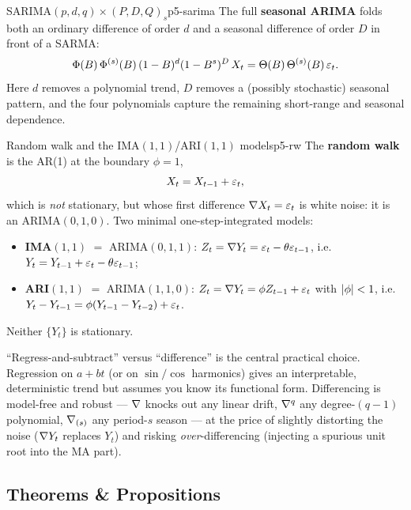 \begin{definition}{SARIMA$(p,d,q)\times(P,D,Q)_s$}{p5-sarima}
The full \textbf{seasonal ARIMA} folds both an ordinary difference of order $d$
and a seasonal difference of order $D$ in front of a SARMA:
\[
\Phi(B)\,\Phi^{(s)}(B)\,(1-B)^{d}(1-B^{s})^{D}\,X_t
=\Theta(B)\,\Theta^{(s)}(B)\,\varepsilon_t .
\]
Here $d$ removes a polynomial trend, $D$ removes a (possibly stochastic)
seasonal pattern, and the four polynomials capture the remaining short-range and
seasonal dependence.
\end{definition}

\begin{definition}{Random walk and the IMA$(1,1)$/ARI$(1,1)$ models}{p5-rw}
The \textbf{random walk} is the AR(1) at the boundary $\phi=1$,
\[
X_t=X_{t-1}+\varepsilon_t ,
\]
which is \emph{not} stationary, but whose first difference $\nabla X_t=\varepsilon_t$ is
white noise: it is an ARIMA$(0,1,0)$. Two minimal one-step-integrated models:
\begin{itemize}
\item \textbf{IMA$(1,1)$} $=$ ARIMA$(0,1,1)$: $Z_t=\nabla Y_t=\varepsilon_t-\theta\varepsilon_{t-1}$,
      i.e.\ $Y_t=Y_{t-1}+\varepsilon_t-\theta\varepsilon_{t-1}$;
\item \textbf{ARI$(1,1)$} $=$ ARIMA$(1,1,0)$: $Z_t=\nabla Y_t=\phi Z_{t-1}+\varepsilon_t$
      with $\left\lvert \phi \right\rvert<1$, i.e.\ $Y_t-Y_{t-1}=\phi(Y_{t-1}-Y_{t-2})+\varepsilon_t$.
\end{itemize}
Neither $\{Y_t\}$ is stationary.
\end{definition}

\begin{intuition}
``Regress-and-subtract'' versus ``difference'' is the central practical choice.
Regression on $a+bt$ (or on $\sin/\cos$ harmonics) gives an interpretable,
deterministic trend but assumes you know its functional form. Differencing is
model-free and robust --- $\nabla$ knocks out any linear drift, $\nabla^{q}$ any
degree-$(q-1)$ polynomial, $\nabla_{(s)}$ any period-$s$ season --- at the price
of slightly distorting the noise ($\nabla Y_t$ replaces $Y_t$) and risking
\emph{over}-differencing (injecting a spurious unit root into the MA part).
\end{intuition}

\subsection{Theorems \& Propositions}

